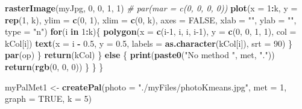 \documentclass[]{book}
\newenvironment{Shaded}{\begin{snugshade}}{\end{snugshade}}
\newcommand{\CommentTok}[1]{\textcolor[rgb]{0.56,0.35,0.01}{\textit{#1}}}
\newcommand{\ControlFlowTok}[1]{\textcolor[rgb]{0.13,0.29,0.53}{\textbf{#1}}}
\newcommand{\DataTypeTok}[1]{\textcolor[rgb]{0.13,0.29,0.53}{#1}}
\newcommand{\DecValTok}[1]{\textcolor[rgb]{0.00,0.00,0.81}{#1}}
\newcommand{\FloatTok}[1]{\textcolor[rgb]{0.00,0.00,0.81}{#1}}
\newcommand{\KeywordTok}[1]{\textcolor[rgb]{0.13,0.29,0.53}{\textbf{#1}}}
\newcommand{\NormalTok}[1]{#1}
\newcommand{\OperatorTok}[1]{\textcolor[rgb]{0.81,0.36,0.00}{\textbf{#1}}}
\newcommand{\OtherTok}[1]{\textcolor[rgb]{0.56,0.35,0.01}{#1}}
\newcommand{\StringTok}[1]{\textcolor[rgb]{0.31,0.60,0.02}{#1}}
\begin{document}
\begin{Shaded}
\begin{Highlighting}[]
                \KeywordTok{rasterImage}\NormalTok{(myJpg, }\DecValTok{0}\NormalTok{, }\DecValTok{0}\NormalTok{, }\DecValTok{1}\NormalTok{, }\DecValTok{1}\NormalTok{)}
                \CommentTok{# par(mar = c(0, 0, 0, 0))}
                \KeywordTok{plot}\NormalTok{(}\DataTypeTok{x =} \DecValTok{1}\OperatorTok{:}\NormalTok{k, }\DataTypeTok{y =} \KeywordTok{rep}\NormalTok{(}\DecValTok{1}\NormalTok{, k), }\DataTypeTok{ylim =} \KeywordTok{c}\NormalTok{(}\DecValTok{0}\NormalTok{, }\DecValTok{1}\NormalTok{), }
                    \DataTypeTok{xlim =} \KeywordTok{c}\NormalTok{(}\DecValTok{0}\NormalTok{, k), }\DataTypeTok{axes =} \OtherTok{FALSE}\NormalTok{, }\DataTypeTok{xlab =} \StringTok{""}\NormalTok{, }
                    \DataTypeTok{ylab =} \StringTok{""}\NormalTok{, }\DataTypeTok{type =} \StringTok{"n"}\NormalTok{)}
                \ControlFlowTok{for}\NormalTok{(i }\ControlFlowTok{in} \DecValTok{1}\OperatorTok{:}\NormalTok{k)\{}
                    \KeywordTok{polygon}\NormalTok{(}\DataTypeTok{x =} \KeywordTok{c}\NormalTok{(i}\DecValTok{-1}\NormalTok{, i, i, i}\DecValTok{-1}\NormalTok{), }\DataTypeTok{y =} \KeywordTok{c}\NormalTok{(}\DecValTok{0}\NormalTok{, }\DecValTok{0}\NormalTok{, }\DecValTok{1}\NormalTok{, }\DecValTok{1}\NormalTok{), }
                        \DataTypeTok{col =}\NormalTok{ kCol[i])}
                    \KeywordTok{text}\NormalTok{(}\DataTypeTok{x =}\NormalTok{ i }\OperatorTok{-}\StringTok{ }\FloatTok{0.5}\NormalTok{, }\DataTypeTok{y =} \FloatTok{0.5}\NormalTok{, }
                        \DataTypeTok{labels =} \KeywordTok{as.character}\NormalTok{(kCol[i]), }\DataTypeTok{srt =} \DecValTok{90}\NormalTok{)}
\NormalTok{                \}}
                \KeywordTok{par}\NormalTok{(op)}
\NormalTok{            \}}
            \KeywordTok{return}\NormalTok{(kCol)}
\NormalTok{        \} }\ControlFlowTok{else}\NormalTok{ \{}
            \KeywordTok{print}\NormalTok{(}\KeywordTok{paste0}\NormalTok{(}\StringTok{"No method "}\NormalTok{, met, }\StringTok{"."}\NormalTok{))}
            \KeywordTok{return}\NormalTok{(}\KeywordTok{rgb}\NormalTok{(}\DecValTok{0}\NormalTok{, }\DecValTok{0}\NormalTok{, }\DecValTok{0}\NormalTok{))}
\NormalTok{        \}}
\NormalTok{    \}}
\NormalTok{\}}

\NormalTok{myPalMet1 <-}\StringTok{ }\KeywordTok{createPal}\NormalTok{(}\DataTypeTok{photo =} \StringTok{"./myFiles/photoKmeans.jpg"}\NormalTok{, }
  \DataTypeTok{met =} \DecValTok{1}\NormalTok{, }\DataTypeTok{graph =} \OtherTok{TRUE}\NormalTok{, }\DataTypeTok{k =} \DecValTok{5}\NormalTok{)}
\end{Highlighting}
\end{Shaded}
\end{document}
